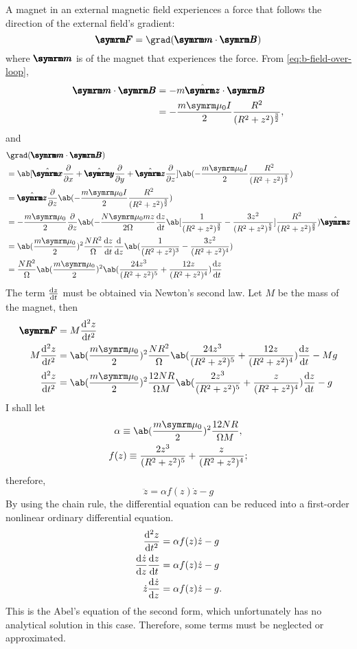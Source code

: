 A magnet in an external magnetic field experiences a force that follows the direction of the external field's gradient: 
\begin{equation}
	\vv{F} = \grad(\vv{m}\cdot\vv{B})
\end{equation}
where $\vv{m}$ is of the magnet that experiences the force. From \cref{eq:b-field-over-loop},
\begin{align}
	\vv{m}\cdot\vv{B} &= -m\zhat\cdot\vv{B} \\
					  &= -\frac{m\bperm I}{2}\frac{R^2}{(R^2 + z^2)^{\frac{3}{2}}},
\end{align}
and
\begin{align}
	&\grad(\vv{m}\cdot\vv{B}) \nonumber\\
	&= \ab[\xhat\pdv{}{x} + \yhat\pdv{}{y} + \zhat\pdv{}{z}]\ab(-\frac{m\bperm I}{2}\frac{R^2}{(R^2 + z^2)^{\frac{3}{2}}}) \\
	&= \zhat\pdv*{\ab(-\frac{m\bperm I}{2}\frac{R^2}{(R^2 + z^2)^{\frac{3}{2}}})}{z} \\
	&= -\frac{m\bperm}{2}\pdv*{\ab(-\frac{N\bperm mz}{2\Omega}\odv{z}{t}\ab[\frac{1}{(R^2 + z^2)^{\frac{3}{2}}} - \frac{3z^2}{(R^2 + z^2)^{\frac{5}{2}}}]\frac{R^2}{(R^2 + z^2)^{\frac{3}{2}}})}{z}\zhat \nonumber\\
	&= \ab(\frac{m\bperm}{2})^2\frac{NR^2}{\Omega}\odv{z}{t}\odv*{\ab(\frac{1}{(R^2 + z^2)^{3}} - \frac{3z^2}{(R^2 + z^2)^4})}{z} \\
	&= \frac{NR^2}{\Omega}\ab(\frac{m\bperm}{2})^2\ab(\frac{24z^3}{(R^2 + z^2)^5} + \frac{12z}{(R^2 + z^2)^4})\odv{z}{t}
\end{align}
The term $\odv{z}{t}$ must be obtained via Newton's second law. Let $M$ be the mass of the magnet, then
\begin{align}
	\vv{F} &= M\odv[ord = 2]{z}{t} \\
	M\odv[ord = 2]{z}{t} &= \ab(\frac{m\bperm}{2})^2\frac{NR^2}{\Omega}\ab(\frac{24z^3}{(R^2 + z^2)^5} + \frac{12z}{(R^2 + z^2)^4})\odv{z}{t} - Mg \\
	\odv[ord = 2]{z}{t} &= \ab(\frac{m\bperm}{2})^2\frac{12NR}{\Omega M}\ab(\frac{2z^3}{(R^2 + z^2)^5} + \frac{z}{(R^2 + z^2)^4})\odv{z}{t} - g
\end{align}
I shall let
\begin{gather}
	\alpha \equiv \ab(\frac{m\bperm}{2})^2\frac{12NR}{\Omega M}, \\
	f(z) \equiv \frac{2z^3}{(R^2 + z^2)^5} + \frac{z}{(R^2 + z^2)^4};
\end{gather}
therefore,
\begin{equation}
	\ddot{z} = \alpha f(z)\dot{z} - g
\end{equation}
By using the chain rule, the differential equation can be reduced into a first-order nonlinear ordinary differential equation.
\begin{align}
	\odv[ord = 2]{z}{t} &= \alpha f(z)\dot{z} - g \\
	\odv{\dot{z}}{z}\odv{z}{t} &= \alpha f(z)\dot{z} - g \\
	\dot{z}\odv{\dot{z}}{z} &= \alpha f(z)\dot{z} - g.
\end{align}
This is the Abel's equation of the second form, which unfortunately has no analytical solution in this case. Therefore, some terms must be neglected or approximated.

